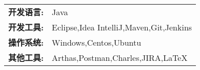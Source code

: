 %
%
%

\renewcommand{\arraystretch}{1.1}

	\begin{tabular}{>{}r>{}p{13cm}}
	    \textbf{开发语言:}& Java\\
		\textbf{开发工具:}&Eclipse,Idea IntelliJ,Maven,Git,Jenkins\\
		\textbf{操作系统:}	        &   Windows,Centos,Ubuntu\\
    \textbf{其他工具:}							&   Arthas,Postman,Charles,JIRA,LaTeX\\
	\end{tabular}
